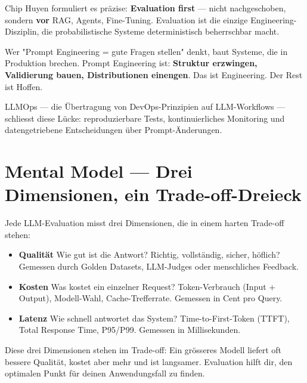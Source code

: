 Chip Huyen formuliert es präzise: \textbf{Evaluation first} — nicht nachgeschoben, sondern \textbf{vor} RAG, Agents, Fine-Tuning. Evaluation ist die einzige Engineering-Disziplin, die probabilistische Systeme deterministisch beherrschbar macht.

\par
\vspace{0.5cm}
\begin{realitycheckEnv}
Wer "Prompt Engineering = gute Fragen stellen" denkt, baut Systeme, die in Produktion brechen. Prompt Engineering ist: \textbf{Struktur erzwingen, Validierung bauen, Distributionen einengen}. Das ist Engineering. Der Rest ist Hoffen.
\end{realitycheckEnv}

LLMOps — die Übertragung von DevOps-Prinzipien auf LLM-Workflows — schliesst diese Lücke: reproduzierbare Tests, kontinuierliches Monitoring und datengetriebene Entscheidungen über Prompt-Änderungen.

\section{Mental Model — Drei Dimensionen, ein Trade-off-Dreieck}

Jede LLM-Evaluation misst drei Dimensionen, die in einem harten Trade-off stehen:

\begin{itemize}
    \item \textbf{Qualität} Wie gut ist die Antwort? Richtig, vollständig, sicher, höflich? Gemessen durch Golden Datasets, LLM-Judges oder menschliches Feedback.
    \item \textbf{Kosten} Was kostet ein einzelner Request? Token-Verbrauch (Input + Output), Modell-Wahl, Cache-Trefferrate. Gemessen in Cent pro Query.
    \item \textbf{Latenz} Wie schnell antwortet das System? Time-to-First-Token (TTFT), Total Response Time, P95/P99. Gemessen in Millisekunden.
\end{itemize}

Diese drei Dimensionen stehen im Trade-off: Ein grösseres Modell liefert oft bessere Qualität, kostet aber mehr und ist langsamer. Evaluation hilft dir, den optimalen Punkt für deinen Anwendungsfall zu finden.

